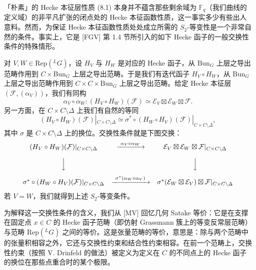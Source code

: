 \documentclass[11pt,a4paper]{article}
\newcommand{\Bun}{\mathrm{Bun}}
\begin{document}
「朴素」的 Hecke 本征层性质 (8.1) 本身并不蕴含那些剩余域为 $\mathbb{F}_q$（我们曲线的定义域）的非平凡扩张的闭点处的 Hecke 本征函数性质，这一事实多少有些出人意料。然而，为保证 Hecke 本征函数性质处处成立所需的 $S_2$-等变性是一个非常自然的条件。事实上，它是 [FGV] 第 1.4 节所引入的如下 Hecke 函子的一般交换性条件的特殊情形。

对 $V, W\in \mathrm{Rep}({}^{L}G)$，设 $H_V$ 与 $H_W$ 是对应的 Hecke 函子，从 $\Bun_G$ 上层之导出范畴作用到 $C\times \Bun_G$ 上层之导出范畴。于是我们有迭代函子 $H_V\circ H_W$，从 $\Bun_G$ 上层之导出范畴作用到 $C\times C\times \Bun_G$ 上层之导出范畴。给定 Hecke 本征层 $(\mathcal{F}, (\alpha_V))$，我们有同构
\[
\alpha_V\circ \alpha_W : (H_V\circ H_W)(\mathcal{F}) \simeq \mathcal{E}_V\boxtimes \mathcal{E}_W\boxtimes \mathcal{F}.
\]
另一方面，在 $C\times C\setminus\Delta$ 上我们有自然的等同
\[
(H_V\circ H_W)(\mathcal{F})|_{C\times C\setminus\Delta} \simeq \sigma^*\circ (H_W\circ H_V)(\mathcal{F})|_{C\times C\setminus\Delta},
\]
其中 $\sigma$ 是 $C\times C\setminus\Delta$ 上的换位。交换性条件就是下图交换：
\[
\begin{array}{ccc}
(H_V\circ H_W)(\mathcal{F})|_{C\times C\setminus\Delta} & \xrightarrow{\ \alpha_V\circ\alpha_W\ } & \mathcal{E}_V\boxtimes \mathcal{E}_W\boxtimes \mathcal{F}|_{C\times C\setminus\Delta}\\[10pt]
\Big\downarrow & & \Big\downarrow\\[10pt]
\sigma^*\circ (H_W\circ H_V)(\mathcal{F})|_{C\times C\setminus\Delta} & \xrightarrow{\ \sigma^*(\alpha_W\circ\alpha_V)\ } & \sigma^*(\mathcal{E}_W\boxtimes \mathcal{E}_V)\boxtimes \mathcal{F}|_{C\times C\setminus\Delta}
\end{array}
\]
若 $V = W$，我们就得到上述 $S_2$-等变条件。


为解释这一交换性条件的含义，我们从 [MV] 回忆几何 Satake 等价：它是在支撑在固定点 $x\in C$ 的 Hecke 函子范畴（即仿射 Grassmann 簇上的等变反常层范畴）与范畴 $\mathrm{Rep}({}^{L}G)$ 之间的等价。这是张量范畴的等价，意思是：除与两个范畴中的张量积相容之外，它还与交换性约束和结合性约束相容。在前一个范畴上，交换性约束（按照 V. Drinfeld 的做法）被定义为定义在 $C$ 的不同点上的 Hecke 函子的换位在那些点重合时的某个极限。

\end{document}
